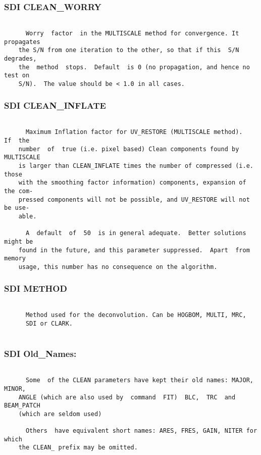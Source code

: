 \subsubsection{SDI CLEAN\_WORRY}
\begin{verbatim}

      Worry  factor  in the MULTISCALE method for convergence. It propagates
    the S/N from one iteration to the other, so that if this  S/N  degrades,
    the  method  stops.  Default  is 0 (no propagation, and hence no test on
    S/N).  The value should be < 1.0 in all cases.

\end{verbatim}
\subsubsection{SDI CLEAN\_INFLATE}
\begin{verbatim}

      Maximum Inflation factor for UV_RESTORE (MULTISCALE method).   If  the
    number  of  true (i.e. pixel based) Clean components found by MULTISCALE
    is larger than CLEAN_INFLATE times the number of compressed (i.e.  those
    with the smoothing factor information) components, expansion of the com-
    pressed components will not be possible, and UV_RESTORE will not be use-
    able.

      A  default  of  50  is in general adequate.  Better solutions might be
    found in the future, and this parameter suppressed.  Apart  from  memory
    usage, this number has no consequence on the algorithm.

\end{verbatim}
\subsubsection{SDI METHOD}
\begin{verbatim}

      Method used for the deconvolution. Can be HOGBOM, MULTI, MRC,
      SDI or CLARK.


\end{verbatim}
\subsubsection{SDI Old\_Names:}
\begin{verbatim}

      Some  of the CLEAN parameters have kept their old names: MAJOR, MINOR,
    ANGLE (which are also used by  command  FIT)  BLC,  TRC  and  BEAM_PATCH
    (which are seldom used)

      Others  have equivalent short names: ARES, FRES, GAIN, NITER for which
    the CLEAN_ prefix may be omitted.

\end{verbatim}
